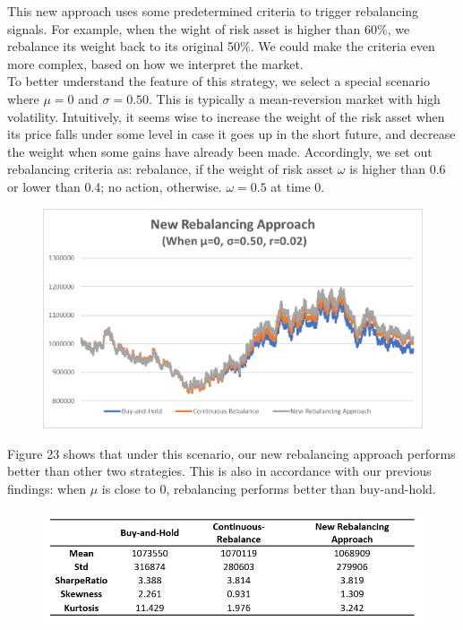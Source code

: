 \documentclass[
10pt, %
a4paper, %
oneside, %
headinclude,footinclude, %
BCOR5mm, %
]{scrartcl}
\begin{document}
This new approach uses some predetermined criteria to trigger rebalancing signals. For example, when the wight of risk asset is higher than 60\%, we rebalance its weight back to its original 50\%. We could make the criteria even more complex, based on how we interpret the market.\\

To better understand the feature of this strategy, we select a special scenario where $\mu = 0$ and $\sigma = 0.50$. This is typically a mean-reversion market with high volatility. Intuitively, it seems wise to increase the weight of the risk asset when its price falls under some level in case it goes up in the short future, and decrease the weight when some gains have already been made. Accordingly, we set out rebalancing criteria as: rebalance, if the weight of risk asset $\omega$ is higher than 0.6 or lower than 0.4; no action, otherwise. $\omega = 0.5$ at time 0.\\


\begin{figure}[H]
	\centering
	\includegraphics[width=0.7\linewidth]{newApproach}
	\caption{}
	\label{fig:newapproach}
\end{figure}

Figure 23 shows that under this scenario, our new rebalancing approach performs better than other two strategies. This is also in accordance with our previous findings: when $\mu$ is close to 0, rebalancing performs better than buy-and-hold.\\

\begin{figure}[H]
	\centering
	\large
	\includegraphics[width=1.0\linewidth]{newApproachTable}
	\caption{}
	\label{fig:newapproachtable}
\end{figure}
\end{document}
